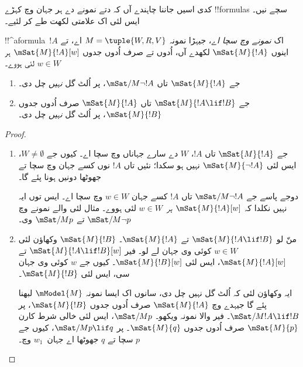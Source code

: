 \documentclass[../../../include/open-logic-section]{subfiles}
\begin{document}


کدی اسیں جاننا چاہندے آں کہ دتے نمونے دے ہر جہان وچ کہڑے !!{formula}s سچے نیں۔ ایس لئی اک علامتی لکھت طے کر لئیے۔

\begin{defn}
  !!^a{formula}~$!A$ اک \emph{نمونے وچ سچا اے}، جیہڑا نمونہ $M = \tuple{W, R,
    V}$ اے، تے اینوں $\mSat{M}{!A}$ لکھدے آں، اُدوں تے صرف اُدوں جدوں $\mSat{M}{!A}[w]$
  ہر $w \in W$ لئی ہووے۔
\end{defn}

\begin{prop}
  \begin{enumerate}
  \item جے $\mSat{M}{!A}$ تاں $\mSat/{M}{\lnot !A}$، پر اُلٹ گل \emph{نہیں} چل دی۔
  \item جے $\mSat{M}{!A \lif !B}$ تاں $\mSat{M}{!A}$ صرف اُدوں جدوں
    $\mSat{M}{!B}$، پر اُلٹ گل \emph{نہیں} چل دی۔
  \end{enumerate}
\end{prop}

\begin{proof}
  \begin{enumerate}
  \item جے $\mSat{M}{!A}$ تاں $!A$، $W$ دے سارے جہاناں وچ سچا اے۔ کیوں جے $W \neq \emptyset$، ایس لئی $\mSat{M}{\lnot!A}$ نہیں ہو سکدا؛ نئیں تاں $!A$ نوں کسے جہان وچ سچا تے جھوٹھا دونیں ہونا پئے گا۔

    دوجے پاسے جے $\mSat/{M}{\lnot !A}$ تاں $!A$ کسے جہان $w \in W$ وچ سچا اے۔ ایس توں ایہ نہیں نکلدا کہ $\mSat{M}{!A}[w]$
    \emph{ہر}~$w \in W$ لئی ہووے۔ مثال لئی
     والے نمونے وچ $\mSat/{M}{\lnot p}$ تے $\mSat/{M}{p}$ وی۔
  \item منّ لو $\mSat{M}{!A \lif !B}$ تے $\mSat{M}{!A}$۔ $\mSat{M}{!B}$ وکھاؤن لئی $w \in W$ کوئی وی جہان لے لو۔ فیر
    $\mSat{M}{!A \lif !B}[w]$ تے $\mSat{M}{!A}[w]$، ایس لئی
    $\mSat{M}{!B}[w]$۔ کیوں جے $w$ کوئی وی جہان سی، ایس لئی
    $\mSat{M}{!B}$۔

    ایہ وکھاؤن لئی کہ اُلٹ گل نہیں چل دی، سانوں اک ایسا نمونہ
    $\mModel{M}$ لبھنا پئے گا جیہدے وچ $\mSat{M}{!A}$ صرف اُدوں جدوں $\mSat{M}{!B}$، پر
    $\mSat/{M}{!A \lif !B}$۔ فیر
     والا نمونہ ویکھو۔ $\mSat/{M}{p}$، ایس لئی خالی شرط کارن
    $\mSat{M}{p}$ صرف اُدوں جدوں $\mSat{M}{q}$۔ پر $\mSat/{M}{p \lif
      q}$، کیوں جے $p$ سچا تے $q$ جھوٹھا اے جہان~$w_1$ وچ۔
  \end{enumerate}
\end{proof}
\end{document}
